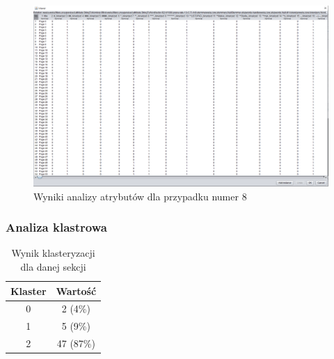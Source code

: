 \documentclass[../EDI_Task2_Karwowski_Kowalewski.tex]{subfiles}
\begin{document}
{{{            \begin{figure}[!htbp]
                \centering
                \includegraphics[width=\textwidth]{img/results2/weeia-case8.png}
                \caption{Wyniki analizy atrybutów dla przypadku numer 8}
            \end{figure}
            \FloatBarrier
        }

        \subsubsection{Analiza klastrowa} {

            \begin{table}[!htbp]
                \small
                \centering
                \begin{tabular}{|c|c|}
                    \hline
                    Klaster & Wartość \\ \hline
                    0   &   2 (4\%) \\
                    1   &   5 (9\%) \\
                    2   &  47 (87\%) \\ \hline
                \end{tabular}
                \caption{Wynik klasteryzacji dla danej sekcji}
            \end{table}
            \FloatBarrier
        }
    }
}
\end{document}
